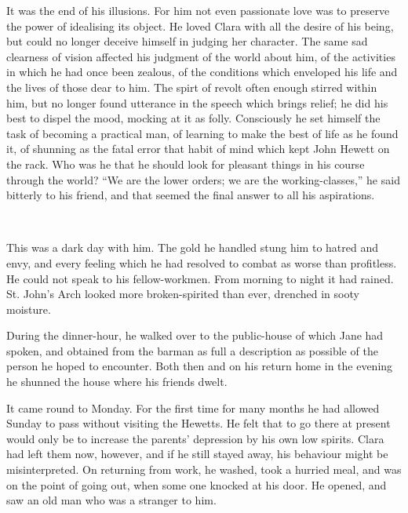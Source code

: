 It was the end of his illusions. For him not even passionate love was to
preserve the power of idealising its object. He loved Clara with all the
desire of his being, but could no longer deceive himself in judging her
character. The same sad clearness of vision affected his judgment of the
world about him, of the activities in which he had once been zealous, of
the conditions which enveloped his life and the lives of those dear to
him. The spirt of revolt often enough stirred within him, but no longer
found utterance in the speech which brings relief; he did his best to
dispel the mood, mocking at it as folly. Consciously he set himself the
task of becoming a practical man, of learning to make the best of life
as he found it, of shunning as the fatal error that habit of mind which
kept John Hewett on the rack. Who was he that he should look for
pleasant things in his course through the world? ``We are the lower
orders; we are the working-classes,'' he said
{\protect\hypertarget{141}{}{}}bitterly to his friend, and that seemed
the final answer to all his aspirations.

~

This was a dark day with him. The gold he handled stung him to hatred
and envy, and every feeling which he had resolved to combat as worse
than profitless. He could not speak to his fellow-workmen. From morning
to night it had rained. St. John's Arch looked more broken-spirited than
ever, drenched in sooty moisture.

During the dinner-hour, he walked over to the public-house of which Jane
had spoken, and obtained from the barman as full a description as
possible of the person he hoped to encounter. Both then and on his
return home in the evening he shunned the house where his friends dwelt.

It came round to Monday. For the first time for many months he had
allowed Sunday to pass without visiting the Hewetts. He felt that to go
there at present would only be to increase the parents' depression by
his own low spirits. Clara had left them now,
{\protect\hypertarget{142}{}{}}however, and if he still stayed away, his
behaviour might be misinterpreted. On returning from work, he washed,
took a hurried meal, and was on the point of going out, when some one
knocked at his door. He opened, and saw an old man who was a stranger to
him.
